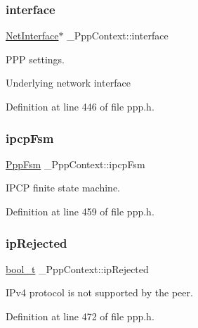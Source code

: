 \subsubsection{\texorpdfstring{interface}{interface}}
{\footnotesize\ttfamily \hyperlink{net_8h_a2234db8911a1148c9159979d8f5e0d6b}{Net\+Interface}$\ast$ \+\_\+\+Ppp\+Context\+::interface}



P\+PP settings. 

Underlying network interface 

Definition at line 446 of file ppp.\+h.

\mbox{\label{struct__PppContext_a9fd2038d20858f726c6414a7cf95ed4a}} 
\subsubsection{\texorpdfstring{ipcp\+Fsm}{ipcpFsm}}
{\footnotesize\ttfamily \hyperlink{structPppFsm}{Ppp\+Fsm} \+\_\+\+Ppp\+Context\+::ipcp\+Fsm}



I\+P\+CP finite state machine. 



Definition at line 459 of file ppp.\+h.

\mbox{\label{struct__PppContext_aabbbef89f6ce54f37a381d2bbcc51a1d}} 
\subsubsection{\texorpdfstring{ip\+Rejected}{ipRejected}}
{\footnotesize\ttfamily \hyperlink{compiler__port_8h_a812d16e5494522586b3784e55d479912}{bool\+\_\+t} \+\_\+\+Ppp\+Context\+::ip\+Rejected}



I\+Pv4 protocol is not supported by the peer. 



Definition at line 472 of file ppp.\+h.

\mbox{\label{struct__PppContext_a483c004aca3fba3f6c04a341f90572f8}} 
